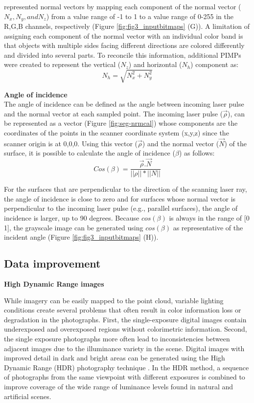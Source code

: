 \documentclass[final,3p,times,twocolumn,authoryear]{elsarticle}
\begin{document}
\cite{barnea2012,barnea2013} represented normal vectors by mapping each component of the normal vector ($N_x, N_y, and N_z$) from a value range  of -1 to 1 to a value range of 0-255 in the R,G,B channels, respectively (Figure \ref{fig:fig3_inputbitmaps} (G)). A limitation of assigning each component of the normal vector with an individual color band is that objects with multiple sides facing different directions are colored differently and divided into several parts. To reconcile this information, additional PIMPs were created to represent the vertical ($N_z$) and horizontal ($N_h$) component as: 
\begin{equation}
{{N}_{h}}=\sqrt{N_{x}^{2}+N_{y}^{2}}
\end{equation}

\noindent \textbf{Angle of incidence}\\
\indent The angle of incidence can be defined as the angle between incoming laser pulse and the normal vector at each sampled point. The incoming laser pulse ($\overrightarrow{\rho}$), can be represented as a vector (Figure \ref{fig:seg-nrmcal}) whose components are the coordinates of the points in the scanner coordinate system (x,y,z) since the scanner origin is at 0,0,0. Using this vector ($\overrightarrow{\rho}$) and the normal vector ($\overrightarrow{N}$) of the surface, it is possible to calculate the angle of incidence ($\beta$) as follows: 
\begin{equation}
Cos(\beta )=\frac{\overrightarrow{\rho}.\overrightarrow{N}}{||\rho||*||N||}
\end{equation}

For the surfaces that are perpendicular to the direction of the scanning laser ray, the angle of incidence is close to zero and for surfaces whose normal vector is perpendicular to the incoming laser pulse (e.g., parallel surfaces), the angle of incidence is larger, up to 90 degrees. Because $cos(\beta)$  is always in the range of [0 1], the grayscale image can be generated using $cos(\beta)$ as representative of the incident angle (Figure \ref{fig:fig3_inputbitmaps} (H)). 

\subsection{Data improvement}

\noindent \textbf{High Dynamic Range images}

While imagery can be easily mapped to the point cloud, variable lighting conditions create several problems that often result in color information loss or degradation in the photographs. First, the single-exposure digital images contain underexposed and overexposed regions without colorimetric information. Second, the single exposure photographs more often lead to inconsistencies between adjacent images due to the illuminance variety in the scene.  
Digital images with improved detail in dark and bright areas can be generated using the High Dynamic Range (HDR) photography technique \cite{reinhard2010}. In the HDR method, a sequence of photographs from the same viewpoint with different exposures is combined to improve coverage of the wide range of luminance levels found in natural and artificial scenes. 
\end{document}
